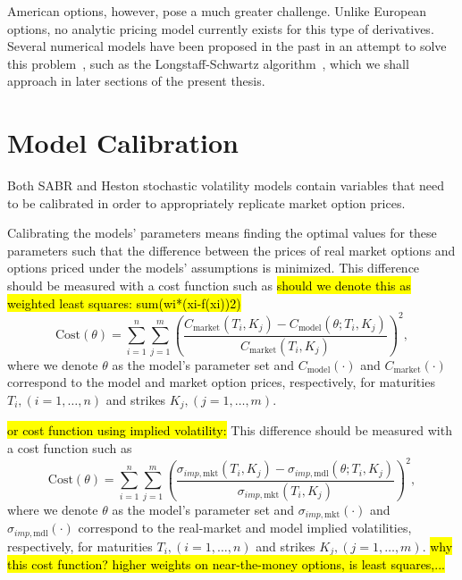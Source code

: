  American options, however, pose a much greater challenge.  Unlike European options, no analytic pricing model currently exists for this type of derivatives. Several numerical models have been proposed in the past in an attempt to solve this problem~\cite{Wilmott1,Hull}, such as the Longstaff-Schwartz algorithm~\citep{Longstaff}, which we shall approach in later sections of the present thesis.
\fi 

 
 
 
\section{Model Calibration}
\label{section:Model Calibration}
Both SABR and Heston stochastic volatility models contain variables that need to be calibrated in order to appropriately replicate market option prices.


Calibrating the models' parameters means finding the optimal values for these parameters such that the difference between the prices of real market options and options priced under the models' assumptions is minimized. This difference should be measured with a cost function such as
\hl{should we denote this as weighted least squares: sum(wi*(xi-f(xi))2)}
\begin{equation}\label{cost}
\mathrm{Cost}(\theta)=\sum_{i=1}^n\sum_{j=1}^m\left(\frac{C_{\mathrm{market}}(T_i,K_j)-C_{\mathrm{model}}(\theta;T_i,K_j)}{C_{\mathrm{market}}(T_i,K_j)}\right)^2,
\end{equation}
\noindent where we denote $\theta$ as the model's parameter set and $C_{\mathrm{model}}(\cdot)$ and $C_{\mathrm{market}}(\cdot)$ correspond to the model and market option prices, respectively, for maturities $T_i,(i=1,\ldots,n)$ and strikes $K_j,(j=1,\ldots,m)$.

\hl{or cost function using implied volatility:}
This difference should be measured with a cost function such as
\begin{equation}\label{cost}
\mathrm{Cost}(\theta)=\sum_{i=1}^n\sum_{j=1}^m\left(\frac{\sigma_{imp,\mathrm{mkt}}(T_i,K_j)-\sigma_{imp,\mathrm{mdl}}(\theta;T_i,K_j)}{\sigma_{imp,\mathrm{mkt}}(T_i,K_j)}\right)^2,
\end{equation}
\noindent where we denote $\theta$ as the model's parameter set and $\sigma_{imp,\mathrm{mkt}}(\cdot)$ and $\sigma_{imp,\mathrm{mdl}}(\cdot)$ correspond to the real-market and model implied volatilities, respectively, for maturities $T_i,(i=1,\ldots,n)$ and strikes $K_j,(j=1,\ldots,m)$.
\hl{why this cost function? higher weights on near-the-money options, is least squares,...}

